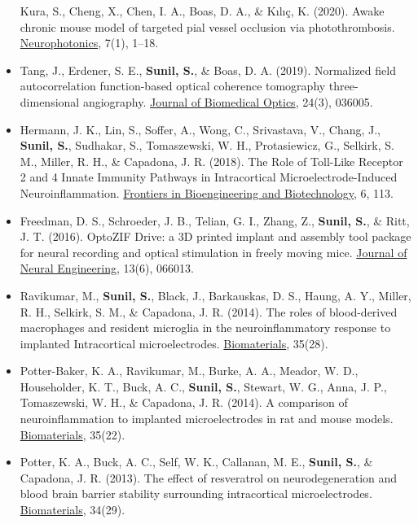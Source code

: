 \documentclass[
  letterpaper,
  DIV=11,
  numbers=noendperiod]{scrartcl}
\begin{document}
\begin{itemize}
  Kura, S., Cheng, X., Chen, I. A., Boas, D. A., \& Kılıç, K. (2020).
  Awake chronic mouse model of targeted pial vessel occlusion via
  photothrombosis.
  \href{https://doi.org/10.1117/1.NPh.7.1.015005}{Neurophotonics}, 7(1),
  1--18.
\item
  Tang, J., Erdener, S. E., \textbf{Sunil, S.}, \& Boas, D. A. (2019).
  Normalized field autocorrelation function-based optical coherence
  tomography three-dimensional angiography.
  \href{https://doi.org/10.1117/1.JBO.24.3.036005}{Journal of Biomedical
  Optics}, 24(3), 036005.
\item
  Hermann, J. K., Lin, S., Soffer, A., Wong, C., Srivastava, V., Chang,
  J., \textbf{Sunil, S.}, Sudhakar, S., Tomaszewski, W. H.,
  Protasiewicz, G., Selkirk, S. M., Miller, R. H., \& Capadona, J. R.
  (2018). The Role of Toll-Like Receptor 2 and 4 Innate Immunity
  Pathways in Intracortical Microelectrode-Induced Neuroinflammation.
  \href{https://doi.org/10.3389/fbioe.2018.00113}{Frontiers in
  Bioengineering and Biotechnology}, 6, 113.
\item
  Freedman, D. S., Schroeder, J. B., Telian, G. I., Zhang, Z.,
  \textbf{Sunil, S.}, \& Ritt, J. T. (2016). OptoZIF Drive: a 3D printed
  implant and assembly tool package for neural recording and optical
  stimulation in freely moving mice.
  \href{https://doi.org/10.1088/1741-2560/13/6/066013}{Journal of Neural
  Engineering}, 13(6), 066013.
\item
  Ravikumar, M., \textbf{Sunil, S.}, Black, J., Barkauskas, D. S.,
  Haung, A. Y., Miller, R. H., Selkirk, S. M., \& Capadona, J. R.
  (2014). The roles of blood-derived macrophages and resident microglia
  in the neuroinflammatory response to implanted Intracortical
  microelectrodes.
  \href{https://doi.org/10.1016/j.biomaterials.2014.05.084}{Biomaterials},
  35(28).
\item
  Potter-Baker, K. A., Ravikumar, M., Burke, A. A., Meador, W. D.,
  Householder, K. T., Buck, A. C., \textbf{Sunil, S.}, Stewart, W. G.,
  Anna, J. P., Tomaszewski, W. H., \& Capadona, J. R. (2014). A
  comparison of neuroinflammation to implanted microelectrodes in rat
  and mouse models.
  \href{https://doi.org/10.1016/j.biomaterials.2014.03.076}{Biomaterials},
  35(22).
\item
  Potter, K. A., Buck, A. C., Self, W. K., Callanan, M. E.,
  \textbf{Sunil, S.}, \& Capadona, J. R. (2013). The effect of
  resveratrol on neurodegeneration and blood brain barrier stability
  surrounding intracortical microelectrodes.
  \href{https://doi.org/10.1016/j.biomaterials.2013.05.035}{Biomaterials},
  34(29).
\end{itemize}
\end{document}
